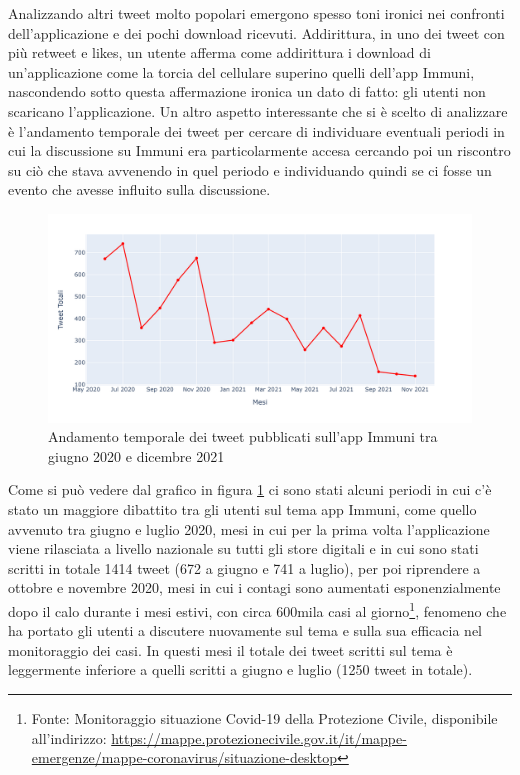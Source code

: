 Analizzando altri tweet molto popolari emergono spesso toni ironici nei confronti dell'applicazione e dei pochi download ricevuti. Addirittura, in uno dei tweet con più retweet e likes, un utente afferma come addirittura i download di un’applicazione come la torcia del cellulare superino quelli dell'app Immuni, nascondendo sotto questa affermazione ironica un dato di fatto: gli utenti non scaricano l'applicazione.
Un altro aspetto interessante che si è scelto di analizzare è l’andamento temporale dei tweet per cercare di individuare eventuali periodi in cui la discussione su Immuni era particolarmente accesa cercando poi un riscontro su ciò che stava avvenendo in quel periodo e individuando quindi se ci fosse un evento che avesse influito sulla discussione.
\begin{figure} [H]
    \centering
    \includegraphics[width = 1\textwidth]{img/tweet_mesi.png}
    \caption{Andamento temporale dei tweet pubblicati sull'app Immuni tra giugno 2020 e dicembre 2021}
    \label{fig:tweet_mesi}
\end{figure}
Come si può vedere dal grafico in figura \ref{fig:tweet_mesi} ci sono stati alcuni periodi in cui c'è stato un maggiore dibattito tra gli utenti sul tema app Immuni, come quello avvenuto tra giugno e luglio 2020, mesi in cui per la prima volta l'applicazione viene rilasciata a livello nazionale su tutti gli store digitali e in cui sono stati scritti in totale 1414 tweet (672 a giugno e 741 a luglio), per poi riprendere a ottobre e novembre 2020, mesi in cui i contagi sono aumentati esponenzialmente dopo il calo durante i mesi estivi, con circa 600mila casi al giorno\footnote{Fonte: Monitoraggio situazione Covid-19 della Protezione Civile, disponibile all'indirizzo: \url{https://mappe.protezionecivile.gov.it/it/mappe-emergenze/mappe-coronavirus/situazione-desktop}}, fenomeno che ha portato gli utenti a discutere nuovamente sul tema e sulla sua efficacia nel monitoraggio dei casi. %
In questi mesi il totale dei tweet scritti sul tema è leggermente inferiore a quelli scritti a giugno e luglio (1250 tweet in totale).

